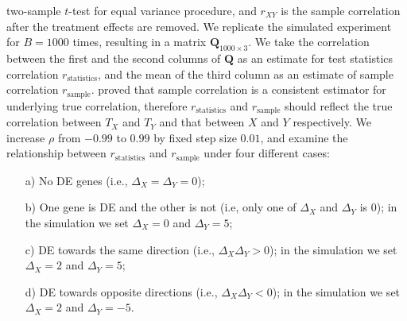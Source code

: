 \documentclass[12pt, a4paper]{article}
\begin{document}
	two-sample $t$-test for equal variance procedure, and $r_{XY}$ is the sample correlation after the treatment effects  are removed. We replicate the simulated
	experiment for $B=1000$ times, resulting in a matrix $\bm Q_{1000\times 3}$. We take the correlation between the first and the second columns of $\bm Q$ as an estimate for test statistics correlation	$r_\text{statistics}$, and 
	the mean of the third column as an estimate of sample correlation $r_{\text{sample}}$. 
	\citet{fisher1915frequency} proved that sample correlation is a consistent estimator for underlying true 
	correlation, therefore
		$r_\text{statistics}$ and $r_{\text{sample}}$ should reflect the true correlation between $T_X$ and $T_Y$ and 
		that between $X$ and $Y$ respectively. 
		We increase $\rho$ from $-0.99$ to $0.99$ by fixed step size $0.01$, and examine the relationship between $r_\text{statistics}$ and $r_{\text{sample}}$ under four different cases:
	\begin{enumerate}
		\item[a)] No DE genes (i.e., $\Delta_X = \Delta_Y  =0$);
		\item[b)] One gene is DE and the other is not (i.e, only one of $\Delta_X$ and $\Delta_Y$ is 0); in the simulation we set $\Delta_X = 0$ and $\Delta_Y=5$;
		\item[c)] DE towards the same direction (i.e., $\Delta_X\Delta_Y>0$); in the simulation we set $\Delta_X = 2$ and $\Delta_Y=5$;
		\item[d)] DE towards opposite directions (i.e., $\Delta_X\Delta_Y <0$); in the simulation we set $\Delta_X = 2$ and $\Delta_Y=-5$.
		\end{enumerate}
		
\end{document}
